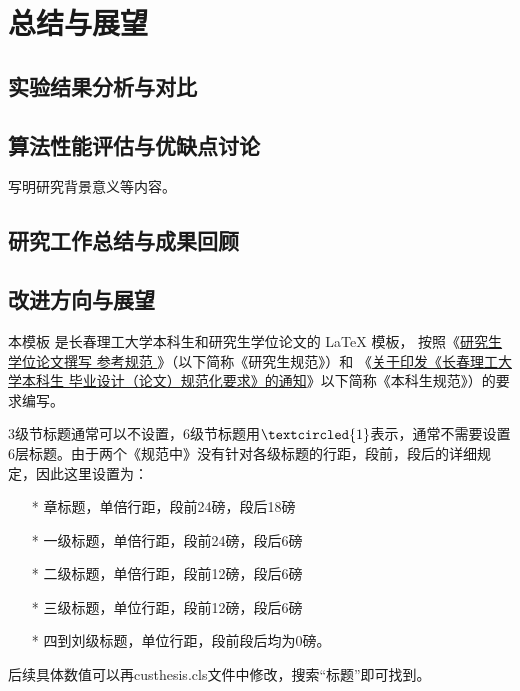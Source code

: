 
\chapter{总结与展望}%
\section{实验结果分析与对比}
\section{算法性能评估与优缺点讨论}
写明研究背景意义等内容。
\section{研究工作总结与成果回顾}
\section{改进方向与展望}
本模板  是长春理工大学本科生和研究生学位论文的 \LaTeX{}
模板， 按照《\href{https://yjs.cust.edu.cn/yjspy/lwssjdb/67113.htm}
{研究生学位论文撰写
参考规范
}》（以下简称《研究生规范》）和
《\href{https://jwc.cust.edu.cn/gzzd/xfwj/76084.htm}
{关于印发《长春理工大学本科生
毕业设计（论文）规范化要求》的通知}》以下简称《本科生规范》）的要求编写。

3级节标题通常可以不设置，6级节标题用$\textcircled{1}$表示，通常不需要设置6层标题。由于两个《规范中》没有针对各级标题的行距，段前，段后的详细规定，因此这里设置为：
\begin{enumerate}
    \item [*]章标题，单倍行距，段前24磅，段后18磅
    \item [*]一级标题，单倍行距，段前24磅，段后6磅
    \item [*]二级标题，单倍行距，段前12磅，段后6磅
    \item [*]三级标题，单位行距，段前12磅，段后6磅
    \item [*]四到刘级标题，单位行距，段前段后均为0磅。
\end{enumerate}
后续具体数值可以再custhesis.cls文件中修改，搜索“标题”即可找到。

